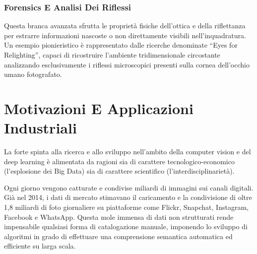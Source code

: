 ﻿\documentclass[11pt, a4paper]{article}
\begin{document}


\subsubsection{Forensics E Analisi Dei Riflessi}
Questa branca avanzata sfrutta le proprietà fisiche dell'ottica e della riflettanza per estrarre informazioni nascoste o non direttamente visibili nell'inquadratura. Un esempio pionieristico è rappresentato dalle ricerche denominate \enquote{Eyes for Relighting}, capaci di ricostruire l'ambiente tridimensionale circostante analizzando esclusivamente i riflessi microscopici presenti sulla cornea dell'occhio umano fotografato.


\newpage

\section{Motivazioni E Applicazioni Industriali}

La forte spinta alla ricerca e allo sviluppo nell'ambito della computer vision e del deep learning è alimentata da ragioni sia di carattere tecnologico-economico (l'esplosione dei Big Data) sia di carattere scientifico (l'interdisciplinarietà).

Ogni giorno vengono catturate e condivise miliardi di immagini sui canali digitali. Già nel 2014, i dati di mercato stimavano il caricamento e la condivisione di oltre 1,8 miliardi di foto giornaliere su piattaforme come Flickr, Snapchat, Instagram, Facebook e WhatsApp. Questa mole immensa di dati non strutturati rende impensabile qualsiasi forma di catalogazione manuale, imponendo lo sviluppo di algoritmi in grado di effettuare una comprensione semantica automatica ed efficiente su larga scala.

\end{document}
